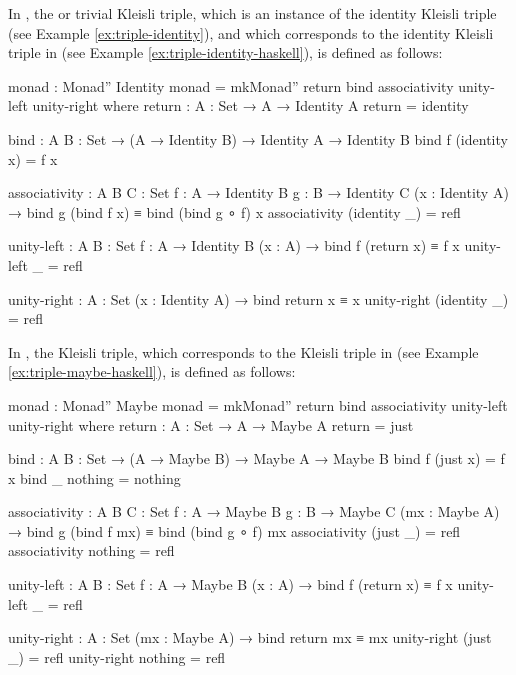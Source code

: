 \begin{example}
  \label{ex:triple-identity-agda}

  In \agda, the  or trivial Kleisli triple, which
  is an instance of the identity Kleisli triple (see Example
  \ref{ex:triple-identity}), and which corresponds to the identity
  Kleisli triple in \hask (see Example
  \ref{ex:triple-identity-haskell}), is defined as follows:
  \begin{codeagda}
monad : Monad'' Identity
monad = mkMonad'' return bind associativity unity-left unity-right
  where
    return : {A : Set} → A → Identity A
    return = identity

    bind : {A B : Set} → (A → Identity B) → Identity A → Identity B
    bind f (identity x) = f x

    associativity : {A B C : Set} {f : A → Identity B}
                    {g : B → Identity C} (x : Identity A) →
                    bind g (bind f x) ≡ bind (bind g ∘ f) x
    associativity (identity _) = refl

    unity-left : {A B : Set} {f : A → Identity B} (x : A) →
                 bind f (return x) ≡ f x
    unity-left _ = refl

    unity-right : {A : Set} (x : Identity A) → bind return x ≡ x
    unity-right (identity _) = refl
  \end{codeagda}
\end{example}

\begin{example}
  \label{ex:triple-maybe-agda}

  In \agda, the  Kleisli triple, which corresponds to
  the  Kleisli triple in \hask (see Example
  \ref{ex:triple-maybe-haskell}), is defined as follows:
  \begin{codeagda}
monad : Monad'' Maybe
monad = mkMonad'' return bind associativity unity-left unity-right
  where
    return : {A : Set} → A → Maybe A
    return = just

    bind : {A B : Set} → (A → Maybe B) → Maybe A → Maybe B
    bind f (just x) = f x
    bind _ nothing  = nothing

    associativity : {A B C : Set} {f : A → Maybe B} {g : B → Maybe C}
                    (mx : Maybe A) →
                    bind g (bind f mx) ≡ bind (bind g ∘ f) mx
    associativity (just _) = refl
    associativity nothing  = refl

    unity-left : {A B : Set} {f : A → Maybe B} (x : A) →
                 bind f (return x) ≡ f x
    unity-left _ = refl

    unity-right : {A : Set} (mx : Maybe A) → bind return mx ≡ mx
    unity-right (just _) = refl
    unity-right nothing  = refl
  \end{codeagda}

\end{example}

